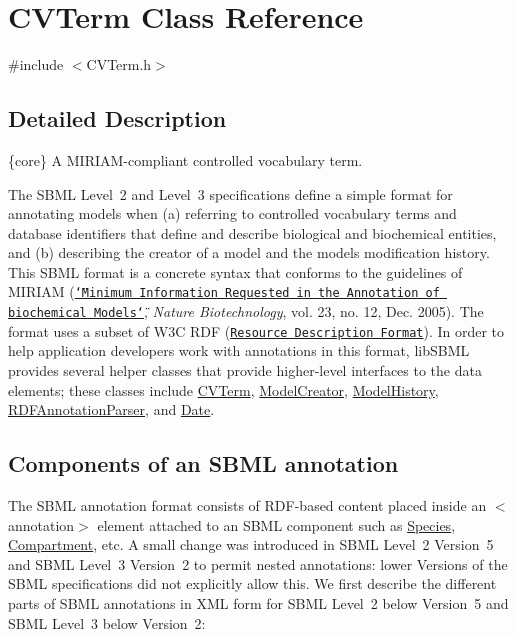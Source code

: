 \hypertarget{class_c_v_term}{}\section{C\+V\+Term Class Reference}
\label{class_c_v_term}


{\ttfamily \#include $<$C\+V\+Term.\+h$>$}



\subsection{Detailed Description}
\{core\} A M\+I\+R\+I\+A\+M-\/compliant controlled vocabulary term.



The S\+B\+ML Level~2 and Level~3 specifications define a simple format for annotating models when (a) referring to controlled vocabulary terms and database identifiers that define and describe biological and biochemical entities, and (b) describing the creator of a model and the model\textquotesingle{}s modification history. This S\+B\+ML format is a concrete syntax that conforms to the guidelines of M\+I\+R\+I\+AM (\href{http://www.nature.com/nbt/journal/v23/n12/abs/nbt1156.html}{\tt \char`\"{}\+Minimum
  Information Requested in the Annotation of biochemical Models\char`\"{}}, {\itshape Nature Biotechnology}, vol. 23, no. 12, Dec. 2005). The format uses a subset of W3C R\+DF (\href{http://www.w3.org/RDF/}{\tt Resource Description Format}). In order to help application developers work with annotations in this format, lib\+S\+B\+ML provides several helper classes that provide higher-\/level interfaces to the data elements; these classes include \hyperlink{class_c_v_term}{C\+V\+Term}, \hyperlink{class_model_creator}{Model\+Creator}, \hyperlink{class_model_history}{Model\+History}, \hyperlink{class_r_d_f_annotation_parser}{R\+D\+F\+Annotation\+Parser}, and \hyperlink{class_date}{Date}.\hypertarget{class_c_v_term_annotation-parts}{}\subsection{Components of an S\+B\+M\+L annotation}\label{class_c_v_term_annotation-parts}
The S\+B\+ML annotation format consists of R\+D\+F-\/based content placed inside an {\ttfamily $<$annotation$>$} element attached to an S\+B\+ML component such as \hyperlink{class_species}{Species}, \hyperlink{class_compartment}{Compartment}, etc. A small change was introduced in S\+B\+ML Level~2 Version~5 and S\+B\+ML Level~3 Version~2 to permit nested annotations\+: lower Versions of the S\+B\+ML specifications did not explicitly allow this. We first describe the different parts of S\+B\+ML annotations in X\+ML form for S\+B\+ML Level~2 below Version~5 and S\+B\+ML Level~3 below Version~2\+:


